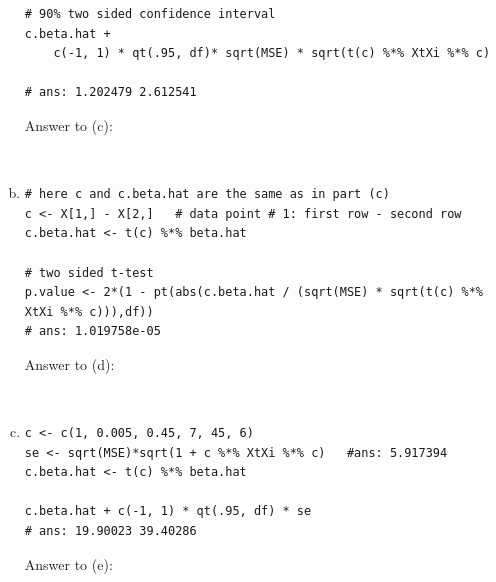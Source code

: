 \documentclass[paper=a4, fontsize=11pt]{scrartcl} %
\begin{document}
\begin{enumerate}[(a)]
\begin{lstlisting}[basicstyle=\ttfamily\small\bfseries]
# 90% two sided confidence interval
c.beta.hat +
    c(-1, 1) * qt(.95, df)* sqrt(MSE) * sqrt(t(c) %*% XtXi %*% c)

# ans: 1.202479 2.612541
\end{lstlisting}

Answer to (c):
\begin{center}
\\
\end{center}
\vspace{5mm}

\item
\begin{lstlisting}[basicstyle=\ttfamily\small\bfseries]
# here c and c.beta.hat are the same as in part (c)
c <- X[1,] - X[2,]   # data point # 1: first row - second row
c.beta.hat <- t(c) %*% beta.hat 

# two sided t-test
p.value <- 2*(1 - pt(abs(c.beta.hat / (sqrt(MSE) * sqrt(t(c) %*% XtXi %*% c))),df))
# ans: 1.019758e-05
\end{lstlisting}

Answer to (d):
\begin{center}
\\
\end{center}

\vspace{5mm}


\item
\begin{lstlisting}[basicstyle=\ttfamily\small\bfseries]
c <- c(1, 0.005, 0.45, 7, 45, 6)
se <- sqrt(MSE)*sqrt(1 + c %*% XtXi %*% c)   #ans: 5.917394
c.beta.hat <- t(c) %*% beta.hat 

c.beta.hat + c(-1, 1) * qt(.95, df) * se
# ans: 19.90023 39.40286
\end{lstlisting}

Answer to (e):
\begin{center}
\\
\end{center}

\vspace{5mm}



\end{enumerate}
\end{document}
